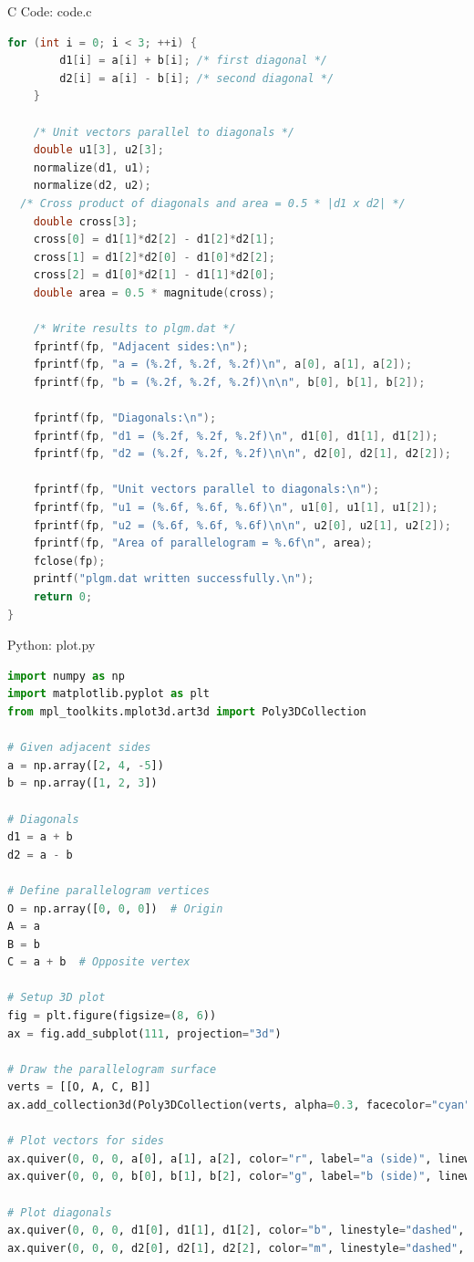 \documentclass{beamer}
\numberwithin{equation}{section}
\theoremstyle{remark}
\begin{document}
\begin{frame}[fragile]{C Code: code.c}
\begin{lstlisting}[language=C]
    for (int i = 0; i < 3; ++i) {
        d1[i] = a[i] + b[i]; /* first diagonal */
        d2[i] = a[i] - b[i]; /* second diagonal */
    }

    /* Unit vectors parallel to diagonals */
    double u1[3], u2[3];
    normalize(d1, u1);
    normalize(d2, u2);
  /* Cross product of diagonals and area = 0.5 * |d1 x d2| */
    double cross[3];
    cross[0] = d1[1]*d2[2] - d1[2]*d2[1];
    cross[1] = d1[2]*d2[0] - d1[0]*d2[2];
    cross[2] = d1[0]*d2[1] - d1[1]*d2[0];
    double area = 0.5 * magnitude(cross);

    /* Write results to plgm.dat */
    fprintf(fp, "Adjacent sides:\n");
    fprintf(fp, "a = (%.2f, %.2f, %.2f)\n", a[0], a[1], a[2]);
    fprintf(fp, "b = (%.2f, %.2f, %.2f)\n\n", b[0], b[1], b[2]);

    fprintf(fp, "Diagonals:\n");
    fprintf(fp, "d1 = (%.2f, %.2f, %.2f)\n", d1[0], d1[1], d1[2]);
    fprintf(fp, "d2 = (%.2f, %.2f, %.2f)\n\n", d2[0], d2[1], d2[2]);

    fprintf(fp, "Unit vectors parallel to diagonals:\n");
    fprintf(fp, "u1 = (%.6f, %.6f, %.6f)\n", u1[0], u1[1], u1[2]);
    fprintf(fp, "u2 = (%.6f, %.6f, %.6f)\n\n", u2[0], u2[1], u2[2]);
    fprintf(fp, "Area of parallelogram = %.6f\n", area);
    fclose(fp);
    printf("plgm.dat written successfully.\n");
    return 0;
}
\end{lstlisting}
\end{frame}

\begin{frame}[fragile]{Python: plot.py}
\begin{lstlisting}[language=Python]
   import numpy as np
import matplotlib.pyplot as plt
from mpl_toolkits.mplot3d.art3d import Poly3DCollection

# Given adjacent sides
a = np.array([2, 4, -5])
b = np.array([1, 2, 3])

# Diagonals
d1 = a + b
d2 = a - b

# Define parallelogram vertices
O = np.array([0, 0, 0])  # Origin
A = a
B = b
C = a + b  # Opposite vertex

# Setup 3D plot
fig = plt.figure(figsize=(8, 6))
ax = fig.add_subplot(111, projection="3d")

# Draw the parallelogram surface
verts = [[O, A, C, B]]
ax.add_collection3d(Poly3DCollection(verts, alpha=0.3, facecolor="cyan"))

# Plot vectors for sides
ax.quiver(0, 0, 0, a[0], a[1], a[2], color="r", label="a (side)", linewidth=2)
ax.quiver(0, 0, 0, b[0], b[1], b[2], color="g", label="b (side)", linewidth=2)

# Plot diagonals
ax.quiver(0, 0, 0, d1[0], d1[1], d1[2], color="b", linestyle="dashed", label="d1 = a+b")
ax.quiver(0, 0, 0, d2[0], d2[1], d2[2], color="m", linestyle="dashed", label="d2 = a-b")
\end{lstlisting}
\end{frame}   
\end{document}
